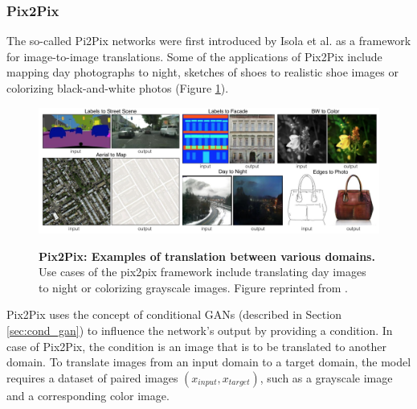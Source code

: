 \documentclass{article}
\begin{document}
\pagebreak
\subsubsection{Pix2Pix}
The so-called Pi2Pix networks were first introduced by Isola et al. \cite{isola_image--image_2016} as a framework for image-to-image translations. Some of the applications of Pix2Pix include mapping day photographs to night, sketches of shoes to realistic shoe images or colorizing black-and-white photos (Figure \ref{fig:pix2pix_example}).

\begin{figure}[h]
\centering
{\includegraphics[width=\linewidth]{GAN/pix2pix_example}}
\caption{\label{fig:pix2pix_example} \textbf{Pix2Pix: Examples of translation between various domains.} Use cases of the pix2pix framework include translating day images to night or colorizing grayscale images. Figure reprinted from \cite{hesse_image--image_nodate-1}.}
\end{figure}

Pix2Pix uses the concept of conditional GANs \cite{mirza_conditional_2014} (described in Section \ref{sec:cond_gan}) to influence the network's output by providing a condition. In case of Pix2Pix, the condition is an image that is to be translated to another domain. To translate images from an input domain to a target domain, the model requires a dataset of paired images $(x_{input}, x_{target})$, such as a grayscale image and a corresponding color image. 
\end{document}
